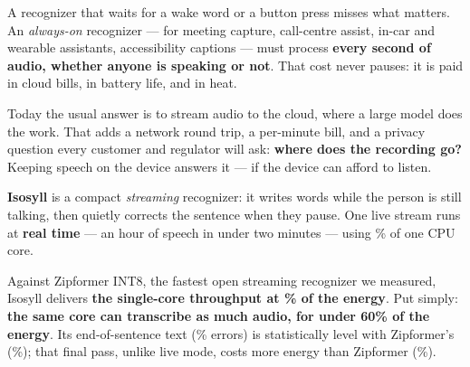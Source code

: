 \documentclass[letterpaper]{article}
\begin{document}
\noindent
\begin{minipage}[t]{0.486\textwidth}
  \vspace{0pt}
  {\fontsize{8.45}{10.5}\selectfont
  A recognizer that waits for a wake word or a button press misses what matters. An \emph{always-on} recognizer --- for meeting capture, call-centre assist, in-car and wearable assistants, accessibility captions --- must process \textbf{every second of audio, whether anyone is speaking or not}. That cost never pauses: it is paid in cloud bills, in battery life, and in heat.

  \vspace{2.5pt}
  Today the usual answer is to stream audio to the cloud, where a large model does the work. That adds a network round trip, a per-minute bill, and a privacy question every customer and regulator will ask: \textbf{where does the recording go?} Keeping speech on the device answers it --- if the device can afford to listen.
  }
\end{minipage}\hfill
\begin{minipage}[t]{0.486\textwidth}
  \vspace{0pt}
  {\fontsize{8.45}{10.5}\selectfont
  \textbf{Isosyll} is a compact \emph{streaming} recognizer: it writes words while the person is still talking, then quietly corrects the sentence when they pause. One live stream runs at \textbf{\ColdRcTwoLiveLmSpeed\x{} real time} --- an hour of speech in under two minutes --- using \ColdRcTwoLiveLmCorePct\% of one CPU core.

  \vspace{2.5pt}
  Against Zipformer INT8, the fastest open streaming recognizer we measured, Isosyll delivers \textbf{\VsSpeedXOne\x{} the single-core throughput at \VsEnergyPctOne\% of the energy}. Put simply: \textbf{the same core can transcribe \VsSpeedXOne\x{} as much audio, for under 60\% of the energy}. Its end-of-sentence text (\ColdRcTwoFinalWer\% errors) is statistically level with Zipformer's (\ColdZipRsixWer\%); that final pass, unlike live mode, costs more energy than Zipformer (\VsEnergyPctTwo\%).
  }
\end{minipage}

\vspace{6pt}
\end{document}
